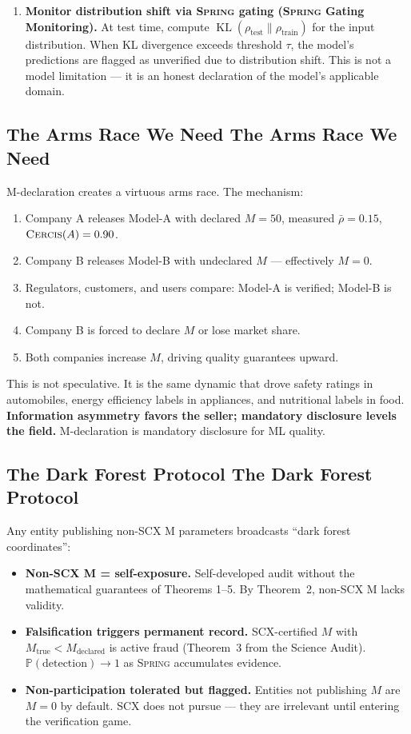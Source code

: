 \documentclass[12pt,a4paper]{article}
\theoremstyle{definition}
\newcommand{\Spring}{\textsc{Spring}}
\newcommand{\Cercis}{\textsc{Cercis}}
\newcommand{\SCX}{\textsc{SCX}}
\DeclareMathOperator{\KL}{KL}
\newcommand{\Pbb}{\mathbb{P}}
\begin{document}
\begin{enumerate}[label=\textbf{Requirement \arabic*:}, nosep]
    \item \textbf{Monitor distribution shift via \Spring{} gating (\Spring{} Gating Monitoring).} At test time, compute $\KL(\rho_{\text{test}} \| \rho_{\text{train}})$ for the input distribution. When KL divergence exceeds threshold $\tau$, the model's predictions are flagged as unverified due to distribution shift. This is not a model limitation — it is an honest declaration of the model's applicable domain.
    
\end{enumerate}

\subsection{The Arms Race We Need The Arms Race We Need}

M-declaration creates a virtuous arms race. The mechanism:

\begin{enumerate}[nosep]
    \item Company A releases Model-A with declared $M=50$, measured $\bar{\rho}=0.15$, $\Cercis(A) = 0.90$.
    \item Company B releases Model-B with undeclared $M$ — effectively $M=0$.
    \item Regulators, customers, and users compare: Model-A is verified; Model-B is not.
    \item Company B is forced to declare $M$ or lose market share.
    \item Both companies increase $M$, driving quality guarantees upward.
\end{enumerate}

This is not speculative. It is the same dynamic that drove safety ratings in automobiles, energy efficiency labels in appliances, and nutritional labels in food. \textbf{Information asymmetry favors the seller; mandatory disclosure levels the field.} M-declaration is mandatory disclosure for ML quality.

\subsection{The Dark Forest Protocol The Dark Forest Protocol}

Any entity publishing non-\SCX{} M parameters broadcasts ``dark forest coordinates'':
\begin{itemize}[nosep]
    \item \textbf{Non-SCX M = self-exposure.} Self-developed audit without the mathematical guarantees of Theorems 1--5. By Theorem~2, non-\SCX{} M lacks validity.
    \item \textbf{Falsification triggers permanent record.} \SCX{}-certified $M$ with $M_{\text{true}} < M_{\text{declared}}$ is active fraud (Theorem~3 from the Science Audit). $\Pbb(\text{detection}) \to 1$ as \Spring{} accumulates evidence.
    \item \textbf{Non-participation tolerated but flagged.} Entities not publishing $M$ are $M=0$ by default. \SCX{} does not pursue — they are irrelevant until entering the verification game.
\end{itemize}
\end{document}
